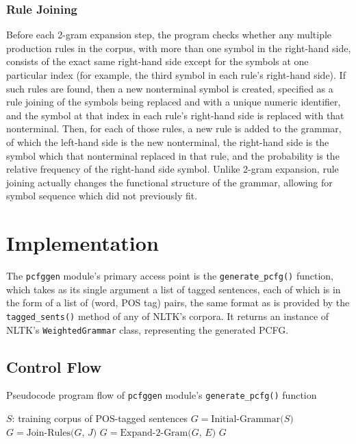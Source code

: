 \documentclass[paper=a4, fontsize=11pt]{scrartcl} %
\numberwithin{equation}{section} %
\numberwithin{figure}{section} %
\numberwithin{table}{section} %
\begin{document}
\subsubsection{Rule Joining}

Before each 2-gram expansion step, the program checks whether any multiple production rules in the corpus, with more than one symbol in the right-hand side, consists of the exact same right-hand side except for the symbols at one particular index (for example, the third symbol in each rule's right-hand side). If such rules are found, then a new nonterminal symbol is created, specified as a rule joining of the symbols being replaced and with a unique numeric identifier, and the symbol at that index in each rule's right-hand side is replaced with that nonterminal. Then, for each of those rules, a new rule is added to the grammar, of which the left-hand side is the new nonterminal, the right-hand side is the symbol which that nonterminal replaced in that rule, and the probability is the relative frequency of the right-hand side symbol. Unlike 2-gram expansion, rule joining actually changes the functional structure of the grammar, allowing for symbol sequence which did not previously fit.


\section{Implementation}

The \texttt{pcfggen} module's primary access point is the \texttt{generate\_pcfg()} function, which takes as its single argument a list of tagged sentences, each of which is in the form of a list of (word, POS tag) pairs, the same format as is provided by the \texttt{tagged\_sents()} method of any of NLTK's corpora. It returns an instance of NLTK's \texttt{WeightedGrammar} class, representing the generated PCFG.

\subsection{Control Flow}

\begin{algorithm}
\caption{Pseudocode program flow of \texttt{pcfggen} module's \texttt{generate\_pcfg()} function}
\begin{algorithmic}
 \Comment $S$: training corpus of POS-tagged sentences
\State $G = \text{Initial-Grammar($S$)}$
\Loop
{}
\State $G = \text{Join-Rules($G$, $J$)}$
\EndWhile
{}
\State $G = \text{Expand-2-Gram($G$, $E$)}$
\Else
\State \Return $G$
\EndIf
\EndLoop
\EndFunction
\end{algorithmic}
\end{algorithm}
\end{document}
